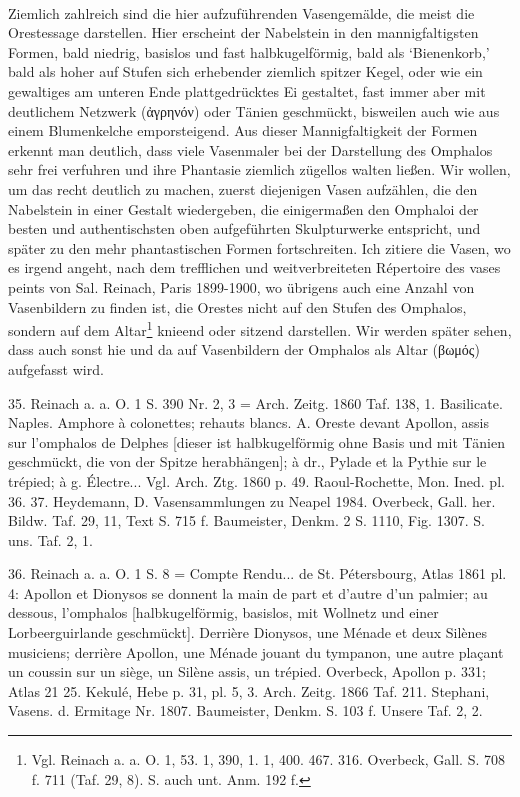 \documentclass[a4paper, 11pt, oneside]{article}
\begin{document}
\paragraph{}
Ziemlich zahlreich sind die hier aufzuführenden Vasengemälde, die meist die Orestessage darstellen. Hier erscheint der Nabelstein in den mannigfaltigsten Formen, bald niedrig, basislos und fast halbkugelförmig, bald als `Bienenkorb,' bald als hoher auf Stufen sich erhebender ziemlich spitzer Kegel, oder wie ein gewaltiges am unteren Ende plattgedrücktes Ei gestaltet, fast immer aber mit deutlichem Netzwerk (ἀγρηνόν) oder Tänien geschmückt, bisweilen auch wie aus einem Blumenkelche emporsteigend. Aus dieser Mannigfaltigkeit der Formen erkennt man deutlich, dass viele Vasenmaler bei der Darstellung des Omphalos sehr frei verfuhren und ihre Phantasie ziemlich zügellos walten ließen. Wir wollen, um das recht deutlich zu machen, zuerst diejenigen Vasen aufzählen, die den Nabelstein in einer Gestalt wiedergeben, die einigermaßen den Omphaloi der besten und authentischsten oben aufgeführten Skulpturwerke entspricht, und später zu den mehr phantastischen Formen fortschreiten. Ich zitiere die Vasen, wo es irgend angeht, nach dem trefflichen und weitverbreiteten Répertoire des vases peints von Sal. Reinach, Paris 1899-1900, wo übrigens auch eine Anzahl von Vasenbildern zu finden ist, die Orestes nicht auf den Stufen des Omphalos, sondern auf dem Altar\footnote{Vgl. Reinach a. a. O. 1, 53. 1, 390, 1. 1, 400. 467. 316. Overbeck, Gall. S. 708 f. 711 (Taf. 29, 8). S. auch unt. Anm. 192 f.} knieend oder sitzend darstellen. Wir werden später sehen, dass auch sonst hie und da auf Vasenbildern der Omphalos als Altar (βωμός) aufgefasst wird.

35. Reinach a. a. O. 1 S. 390 Nr. 2, 3 = Arch. Zeitg. 1860 Taf. 138, 1. Basilicate. Naples. Amphore à colonettes; rehauts blancs. A. Oreste devant Apollon, assis sur l'omphalos de Delphes [dieser ist halbkugelförmig ohne Basis und mit Tänien geschmückt, die von der Spitze herabhängen]; à dr., Pylade et la Pythie sur le trépied; à g. Électre... Vgl. Arch. Ztg. 1860 p. 49. Raoul-Rochette, Mon. Ined. pl. 36. 37. Heydemann, D. Vasensammlungen zu Neapel 1984. Overbeck, Gall. her. Bildw. Taf. 29, 11, Text S. 715 f. Baumeister, Denkm. 2 S. 1110, Fig. 1307. S. uns. Taf. 2, 1.

36. Reinach a. a. O. 1 S. 8 = Compte Rendu... de St. Pétersbourg, Atlas 1861 pl. 4: Apollon et Dionysos se donnent la main de part et d'autre d'un palmier; au dessous, l'omphalos [halbkugelförmig, basislos, mit Wollnetz und einer Lorbeerguirlande geschmückt]. Derrière Dionysos, une Ménade et deux Silènes musiciens; derrière Apollon, une Ménade jouant du tympanon, une autre plaçant un coussin sur un siège, un Silène assis, un trépied. Overbeck, Apollon p. 331; Atlas 21 25. Kekulé, Hebe p. 31, pl. 5, 3. Arch. Zeitg. 1866 Taf. 211. Stephani, Vasens. d. Ermitage Nr. 1807. Baumeister, Denkm. S. 103 f. Unsere Taf. 2, 2.
\end{document}
